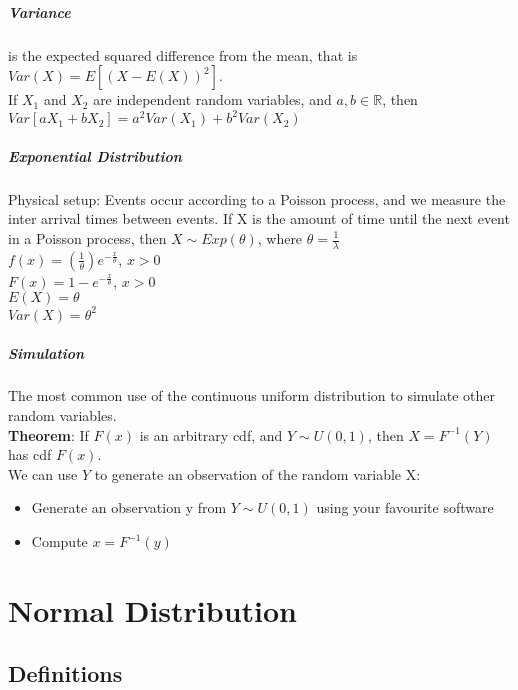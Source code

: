 \documentclass[12pt]{report}
\begin{document}
    \paragraph{Variance} is the expected squared difference from the mean, that
    is $Var(X) = E[(X-E(X))^2]$.\\
    If $X_1$ and $X_2$ are independent random variables, and $a, b \in
    \mathbb{R}$, then $Var[aX_1 + bX_2] = a^2 Var(X_1) + b^2Var(X_2)$

    \paragraph{Exponential Distribution}
      Physical setup: Events occur according to a Poisson process, and we
      measure the inter arrival times between events. If X is the amount of
      time until the next event in a Poisson process, then $X \sim
      Exp(\theta)$, where $\theta = \frac{1}{\lambda}$\\
      $f(x) = (\frac{1}{\theta})e^{-\frac{x}{\theta}}$, $x > 0$\\
      $F(x) = 1 - e^{-\frac{x}{\theta}}$, $x > 0$\\
      $E(X) = \theta$\\
      $Var(X) = \theta^2$

    \paragraph{Simulation}
      The most common use of the continuous uniform distribution to simulate
      other random variables.\\
      \textbf{Theorem}: If $F(x)$ is an arbitrary cdf, and $Y \sim U(0, 1)$,
      then $X = F^{-1}(Y)$ has cdf $F(x)$.\\
      We can use $Y$ to generate an observation of the random variable X:
      \begin{itemize}
        \item Generate an observation y from $Y \sim U(0, 1)$ using your
          favourite software
        \item Compute $x = F^{-1}(y)$
      \end{itemize}


\chapter{Normal Distribution}
  \section{Definitions}
\end{document}
